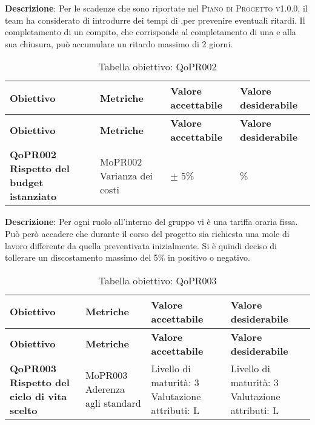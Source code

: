\documentclass[../piano-di-qualifica.tex]{subfiles}
\begin{document}
\textbf{Descrizione}: Per le scadenze che sono riportate nel \textsc{Piano di Progetto v1.0.0}, il team ha considerato di introdurre dei tempi di ,per prevenire eventuali ritardi.  Il completamento di un compito, che corrisponde al completamento di una  e alla sua chiusura, può accumulare un ritardo massimo di 2 giorni.


\renewcommand{\arraystretch}{2} %
\begin{longtable}[H]{>{\centering\bfseries}m{5cm} >{\centering}m{5cm} >{\centering}m{2.5cm} >{\centering\arraybackslash}m{2.5cm}}  
    \caption{Tabella obiettivo: QoPR002}%
    \label{tab:obiettivo_qopr002} \\
  \rowcolor{lightgray}
  {\textbf{Obiettivo}} & {\textbf{Metriche}} & {\textbf{Valore accettabile}} & {\textbf{Valore desiderabile}}  \\
  \endfirsthead%
  \rowcolor{lightgray}
  {\textbf{Obiettivo}} & {\textbf{Metriche}} & {\textbf{Valore accettabile}} & {\textbf{Valore desiderabile}}  \\
  \endhead%
  \textbf{QoPR002 Rispetto del budget istanziato} & MoPR002 Varianza dei costi & $\pm$ 5\% & 0\% \\
\end{longtable}

\textbf{Descrizione}: Per ogni ruolo all’interno del gruppo vi è una tariffa oraria fissa. Può però accadere che durante il corso del progetto sia richiesta una mole di lavoro differente da quella preventivata inizialmente. Si è quindi deciso di tollerare un discostamento massimo del 5\% in positivo o negativo.


\renewcommand{\arraystretch}{2} %
\begin{longtable}[H]{>{\centering\bfseries}m{5cm} >{\centering}m{5cm} >{\centering}m{2.5cm} >{\centering\arraybackslash}m{2.5cm}}  
    \caption{Tabella obiettivo: QoPR003}%
    \label{tab:obiettivo_qopr003} \\
  \rowcolor{lightgray}
  {\textbf{Obiettivo}} & {\textbf{Metriche}} & {\textbf{Valore accettabile}} & {\textbf{Valore desiderabile}}  \\
  \endfirsthead%
  \rowcolor{lightgray}
  {\textbf{Obiettivo}} & {\textbf{Metriche}} & {\textbf{Valore accettabile}} & {\textbf{Valore desiderabile}}  \\
  \endhead%
  \textbf{QoPR003 Rispetto del ciclo di vita scelto} & MoPR003 Aderenza agli standard & Livello di maturità: 3 Valutazione attributi: L & Livello di maturità: 3 Valutazione attributi: L \\
\end{longtable}
\end{document}

